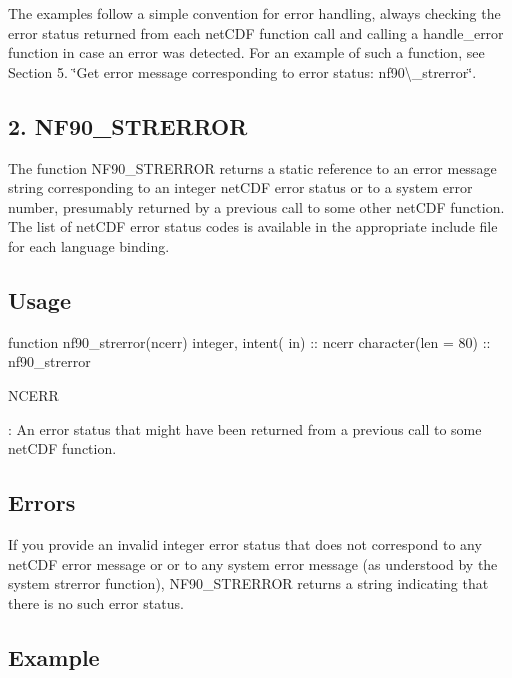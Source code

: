 The examples follow a simple convention for error handling, always checking the error status returned from each net\+C\+DF function call and calling a handle\+\_\+error function in case an error was detected. For an example of such a function, see Section 5. \char`\"{}\+Get error message
corresponding to error status\+: nf90\textbackslash{}\+\_\+strerror\char`\"{}.\hypertarget{f90_datasets_f90-nf90_strerror}{}\subsection{2. N\+F90\+\_\+\+S\+T\+R\+E\+R\+R\+O\+R }\label{f90_datasets_f90-nf90_strerror}
The function N\+F90\+\_\+\+S\+T\+R\+E\+R\+R\+OR returns a static reference to an error message string corresponding to an integer net\+C\+DF error status or to a system error number, presumably returned by a previous call to some other net\+C\+DF function. The list of net\+C\+DF error status codes is available in the appropriate include file for each language binding.

\subsection*{Usage}


\begin{DoxyCode}
\textcolor{keyword}{function }nf90\_strerror(ncerr)
  \textcolor{keywordtype}{integer}, \textcolor{keywordtype}{intent( in)} :: ncerr
  \textcolor{keywordtype}{character(len = 80)}  :: nf90\_strerror
\end{DoxyCode}


{\ttfamily N\+C\+E\+RR}

\+: An error status that might have been returned from a previous call to some net\+C\+DF function.

\subsection*{Errors}

If you provide an invalid integer error status that does not correspond to any net\+C\+DF error message or or to any system error message (as understood by the system strerror function), N\+F90\+\_\+\+S\+T\+R\+E\+R\+R\+OR returns a string indicating that there is no such error status.

\subsection*{Example}

